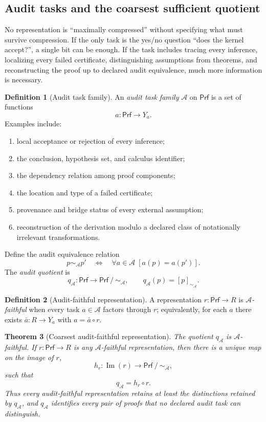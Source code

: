 \documentclass[11pt]{article}
\newcommand{\Prf}{\mathsf{Prf}}
\newcommand{\Img}{\operatorname{Im}}
\newcommand{\quot}{\mathbin{/}}
\newcommand{\eqA}{\mathrel{\sim_{\mathcal A}}}
\newcommand{\qA}{q_{\mathcal A}}
\newcommand{\mcA}{\mathcal A}
\theoremstyle{plain}
\newtheorem{theorem}{Theorem}[section]
\theoremstyle{definition}
\newtheorem{definition}[theorem]{Definition}
\theoremstyle{remark}
\begin{document}
\subsection{Audit tasks and the coarsest sufficient quotient}

No representation is ``maximally compressed'' without specifying what must survive compression.  If the only task is the yes/no question ``does the kernel accept?'', a single bit can be enough.  If the task includes tracing every inference, localizing every failed certificate, distinguishing assumptions from theorems, and reconstructing the proof up to declared audit equivalence, much more information is necessary.

\begin{definition}[Audit task family]
\label{def:auditfamily}
An \emph{audit task family} $\mcA$ on $\Prf$ is a set of functions
\[
  a:\Prf\to Y_a.
\]
Examples include:
\begin{enumerate}
    \item local acceptance or rejection of every inference;
    \item the conclusion, hypothesis set, and calculus identifier;
    \item the dependency relation among proof components;
    \item the location and type of a failed certificate;
    \item provenance and bridge status of every external assumption;
    \item reconstruction of the derivation modulo a declared class of notationally irrelevant transformations.
\end{enumerate}
Define the audit equivalence relation
\[
  p\eqA p'\quad\Longleftrightarrow\quad
  \forall a\in\mcA\;[a(p)=a(p')].
\]
The \emph{audit quotient} is
\[
  \qA:\Prf\to\Prf\quot\eqA,
  \qquad \qA(p)=[p]_{\eqA}.
\]
\end{definition}

\begin{definition}[Audit-faithful representation]
\label{def:faithful}
A representation $r:\Prf\to R$ is \emph{$\mcA$-faithful} when every task $a\in\mcA$ factors through $r$; equivalently, for each $a$ there exists $\bar a:R\to Y_a$ with $a=\bar a\circ r$.
\end{definition}

\begin{theorem}[Coarsest audit-faithful representation]
\label{thm:coarsest}
The quotient $\qA$ is $\mcA$-faithful.  If $r:\Prf\to R$ is any $\mcA$-faithful representation, then there is a unique map on the image of $r$,
\[
  h_r:\Img(r)\to\Prf\quot\eqA,
\]
such that
\[
  \qA=h_r\circ r.
\]
Thus every audit-faithful representation retains at least the distinctions retained by $\qA$, and $\qA$ identifies every pair of proofs that no declared audit task can distinguish.
\end{theorem}
\end{document}
